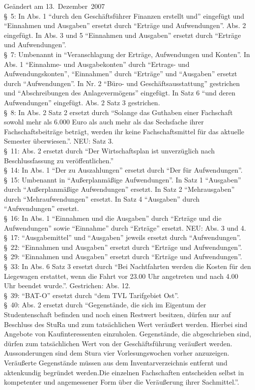 {Geändert am 13.~Dezember~2007\\
§~5: In Abs. 1 "`durch den Geschäftsführer Finanzen erstellt und"' eingefügt und "`Einnahmen und Ausgaben"' ersetzt durch "`Erträge und Aufwendungen"'. Abs. 2 eingefügt. In Abs. 3 und 5 "`Einnahmen und Ausgaben"' ersetzt durch "`Erträge und Aufwendungen"'.\\
§~7: Umbenannt in "`Veranschlagung der Erträge, Aufwendungen und Konten"'. In Abs. 1 "`Einnahme- und Ausgabekonten"' durch "`Ertrags- und Aufwendungskonten"', "`Einnahmen"' durch "`Erträge"' und "`Ausgaben"' ersetzt durch "`Aufwendungen"'. In Nr. 2 "`Büro- und  Geschäftsausstattung"' gestrichen und "`Abschreibungen des Anlagevermögens"' eingefügt. In Satz 6 "`und deren Aufwendungen"' eingefügt. Abs. 2 Satz 3 gestrichen.\\
§~8: In Abs. 2 Satz 2 ersetzt durch "`Solange das Guthaben einer Fachschaft sowohl mehr als 6.000 Euro als auch mehr als das Sechsfache ihrer Fachschaftsbeiträge beträgt, werden ihr keine Fachschaftsmittel für das aktuelle Semester überwiesen."'. NEU: Satz 3.\\
§~11: Abs. 2 ersetzt durch "`Der Wirtschaftsplan ist unverzüglich nach Beschlussfassung zu veröffentlichen."'\\
§~14: In Abs. 1 "`Der zu Auszahlungen"' ersetzt durch "`Der für Aufwendungen"'.\\
§~15: Umbenannt in "`Außerplanmäßige Aufwendungen"'. In Satz 1 "`Ausgaben"' durch "`Außerplanmäßige Aufwendungen"' ersetzt. In Satz 2 "`Mehrausgaben"' durch "`Mehraufwendungen"' ersetzt. In Satz 4 "`Ausgaben"' durch "`Aufwendungen"' ersetzt.\\
§~16: In Abs. 1 "`Einnahmen und die Ausgaben"' durch "`Erträge und die Aufwendungen"' sowie "`Einnahme"' durch "`Erträge"' ersetzt. NEU: Abs. 3 und 4.\\
§~17: "`Ausgabemittel"' und "`Ausgaben"' jeweils ersetzt durch "`Aufwendungen"'.\\
§~22: "`Einnahmen und Ausgaben"' ersetzt durch "`Erträge und Aufwendungen"'.\\
§~29: "`Einnahmen und Ausgaben"' ersetzt durch "`Erträge und Aufwendungen"'.\\
§~33: In Abs. 6 Satz 3 ersetzt durch "`Bei Nachtfahrten werden die Kosten für den Liegewagen erstattet, wenn die Fahrt vor 23.00 Uhr angetreten und nach 4.00 Uhr beendet wurde."'. Gestrichen: Abs. 12.\\
§~39: "`BAT-O"' ersetzt durch "`dem TVL Tarifgebiet Ost"'.\\
§~40: Abs. 2 ersetzt durch "`Gegenstände, die sich im Eigentum der Studentenschaft befinden und noch einen Restwert  besitzen, dürfen nur auf Beschluss des StuRa und zum tatsächlichen Wert veräußert werden. Hierbei sind Angebote von Kaufinteressenten einzuholen. Gegenstände, die abgeschrieben sind, dürfen zum tatsächlichen Wert von der Geschäftsführung veräußert werden. Aussonderungen sind dem Stura vier Vorlesungswochen vorher anzuzeigen. Veräußerte Gegenstände müssen aus dem Inventarverzeichnis entfernt und aktenkundig begründet werden.Die einzelnen Fachschaften entscheiden selbst in kompetenter und angemessener Form über die Veräußerung ihrer Sachmittel."'.

}
